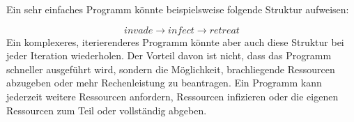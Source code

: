 Ein sehr einfaches Programm könnte beispielsweise folgende Struktur aufweisen:

$$\mathit{invade}\rightarrow\mathit{infect}\rightarrow\mathit{retreat}$$
Ein komplexeres, iterierenderes Programm könnte aber auch diese Struktur bei jeder Iteration wiederholen. Der Vorteil davon ist nicht, dass das Programm schneller ausgeführt wird, sondern die Möglichkeit, brachliegende Ressourcen abzugeben oder mehr Rechenleistung zu beantragen. Ein Programm kann jederzeit weitere Ressourcen anfordern, Ressourcen infizieren oder die eigenen Ressourcen zum Teil oder vollständig abgeben. 
